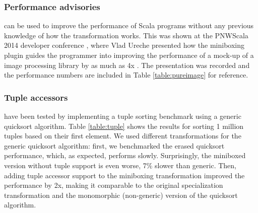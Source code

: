 


\subsubsection{Performance advisories} can be used to improve the performance of Scala programs without any previous knowledge of how the transformation works. This was shown at the PNWScala 2014 developer conference \cite{pnwscala-conf}, where Vlad Ureche presented how the miniboxing plugin guides the programmer into improving the performance of a mock-up of a image processing library by as much as 4x \cite{pnwscala-pureimage}. The presentation was recorded and the performance numbers are included in Table \ref{table:pureimage} for reference.

\subsubsection{Tuple accessors} have been tested by implementing a tuple sorting benchmark using a generic quicksort algorithm. Table \ref{table:tuple} shows the results for sorting 1 million tuples based on their first element. We used different transformations for the generic quicksort algorithm: first, we benchmarked the erased quicksort performance, which, as expected, performs slowly. Surprisingly, the miniboxed version without tuple support is even worse, 7\% slower than generic. Then, adding tuple accessor support to the miniboxing transformation improved the performance by 2x, making it comparable to the original specialization transformation and the monomorphic (non-generic) version of the quicksort algorithm.
